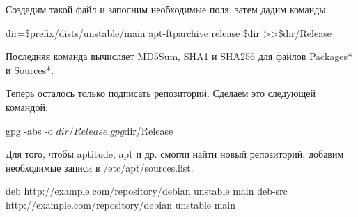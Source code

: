 Создадим такой файл и заполним необходимые поля, затем дадим команды

\ttfamily
dir=\$prefix/dists/unstable/main
apt-ftparchive release \$dir >>\$dir/Release
\normalfont

Последняя команда вычисляет MD5Sum, SHA1 и SHA256 для файлов Packages* и Sources*.

Теперь осталось только подписать репозиторий. Сделаем это следующей командой:

\ttfamily
gpg -abs -o $dir/Release.gpg $dir/Release
\normalfont

Для того, чтобы aptitude, apt и др. смогли найти новый репозиторий, добавим необходимые записи в /etc/apt/sources.list.

\ttfamily
deb http://example.com/repository/debian unstable main
deb-src http://example.com/repository/debian unstable main
\normalfont
